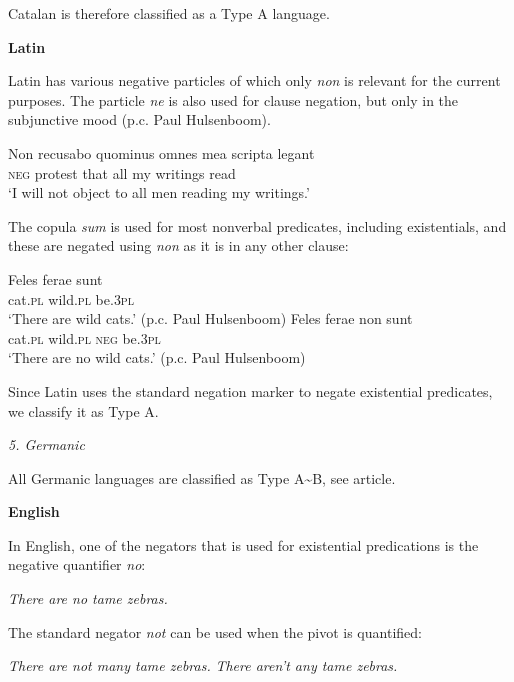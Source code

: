 ﻿\documentclass[output=paper]{langsci/langscibook}
\begin{document}
\begin{unindented}
Catalan is therefore classified as a Type A language. 

\textbf{Latin}

Latin has various negative particles \parencite[129]{GreenoughKittredge1903} of which only \textit{non} is relevant for the current purposes. The particle \textit{ne} is also used for clause negation, but only in the subjunctive mood (p.c. Paul Hulsenboom).
%
\begin{exe}\ex \gll Non recusabo quominus omnes mea scripta   legant \\
\textsc{neg} protest that all my writings read \\
    \glt `I will not object to all men reading my writings.'
\textcite[145]{Roby1862}
    \end{exe}

The copula \textit{sum} is used for most nonverbal predicates, including existentials, and these are negated using \textit{non} as it is in any other clause:
%
\begin{exe}\ex \gll Feles  ferae    sunt \\
cat.\textsc{pl} wild.\textsc{pl} be.\textsc{3pl} \\
    \glt `There are wild cats.' (p.c. Paul Hulsenboom)
\ex \gll Feles  ferae non sunt \\
cat.\textsc{pl} wild.\textsc{pl} \textsc{neg} be.\textsc{3pl} \\
    \glt `There are no wild cats.' (p.c. Paul Hulsenboom)
    \end{exe}

Since Latin uses the standard negation marker to negate existential predicates, we classify it as Type A. 

\textit{5. Germanic}

All Germanic languages are classified as Type A{\textasciitilde}B, see article.

\textbf{English}

In English, one of the negators that is used for existential predications is the negative quantifier \textit{no}: 
%
\begin{exe}\ex \textit{There are no tame zebras.}
    \end{exe}

The standard negator \textit{not} can be used when the pivot is quantified:
%
\begin{exe}\ex \begin{xlist}
\ex \textit{There are not many tame zebras.}
\ex \textit{There aren’t any tame zebras.}
    \end{xlist}\end{exe}


\end{unindented}
\end{document}

